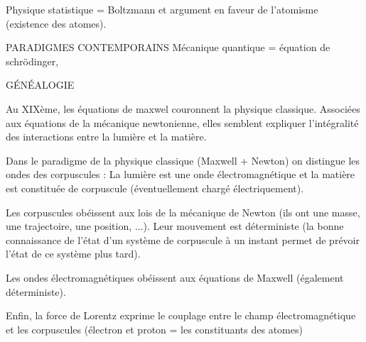 	Physique statistique = Boltzmann et argument en faveur de l'atomisme (existence des atomes).


PARADIGMES CONTEMPORAINS
	Mécanique quantique = équation de schrödinger, 

GÉNÉALOGIE

Au XIXème, les équations de maxwel couronnent la physique classique. Associées aux équations de la mécanique newtonienne, elles semblent expliquer l'intégralité des interactions entre la lumière et la matière.

Dans le paradigme de la physique classique (Maxwell + Newton) on distingue les ondes des corpuscules : La lumière est une onde électromagnétique et la matière est constituée de corpuscule (éventuellement chargé électriquement).

Les corpuscules obéissent aux lois de la mécanique de Newton (ils ont une masse, une trajectoire, une position, ...). Leur mouvement est déterministe (la bonne connaissance de l'état d'un système de corpuscule à un instant permet de prévoir l'état de ce système plus tard).

Les ondes électromagnétiques obéissent aux équations de Maxwell (également déterministe).

Enfin, la force de Lorentz exprime le couplage entre le champ électromagnétique et les corpuscules (électron et proton = les constituants des atomes)




\subsection{}\subsection{}
\begin{center}
\end{center}

